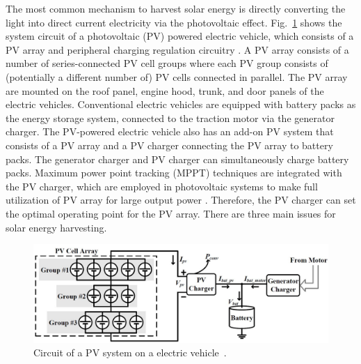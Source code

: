 The most common mechanism to harvest solar energy is directly converting the light into direct current electricity via the photovoltaic effect.
Fig.~\ref{fig:JX_circuit} shows the system circuit of a photovoltaic (PV) powered electric vehicle, which consists of a PV array and peripheral charging regulation circuitry \cite{JX_wang2012dynamic}\cite{JX_kim2014fast}.
A PV array consists of a number of series-connected PV cell groups where each PV group consists of (potentially a different number of) PV cells connected in parallel.
The PV array are mounted on the roof panel, engine hood, trunk, and door panels of the electric vehicles.
Conventional electric vehicles are equipped with battery packs as the energy storage system, connected to the traction motor via the generator charger.
The PV-powered electric vehicle also has an add-on PV system that consists of a PV array and a PV charger connecting the PV array to battery packs.
The generator charger and PV charger can simultaneously charge battery packs.
Maximum power point tracking (MPPT) techniques are integrated with the PV charger, which are employed in photovoltaic systems to make full utilization of PV array for large output power \cite{JX_liu2008variable,JX_arsie2006hybrid,JX_ma2009research}.
Therefore, the PV charger can set the optimal operating point for the PV array.
There are three main issues for solar energy harvesting.

\begin{figure}
\centering
\includegraphics[width=1.0\hsize]{Figures/Jason_Xue/JX_circuit.jpg}
\caption{Circuit of a PV system on a electric vehicle~\cite{JX_wang2012dynamic}.}
\label{fig:JX_circuit}
\end{figure}      


